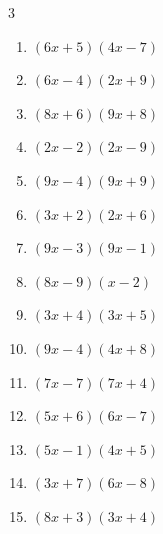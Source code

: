 \begin{multicols}{3}
\begin{enumerate}
  \item $(6x+5)(4x-7)$


  \item $(6x-4)(2x+9)$


  \item $(8x+6)(9x+8)$


  \item $(2x-2)(2x-9)$


  \item $(9x-4)(9x+9)$


  \item $(3x+2)(2x+6)$


  \item $(9x-3)(9x-1)$


  \item $(8x-9)(x-2)$


\columnbreak %

  \item $(3x+4)(3x+5)$


  \item $(9x-4)(4x+8)$


  \item $(7x-7)(7x+4)$


  \item $(5x+6)(6x-7)$


  \item $(5x-1)(4x+5)$


  \item $(3x+7)(6x-8)$


  \item $(8x+3)(3x+4)$


\end{enumerate}
\end{multicols}
